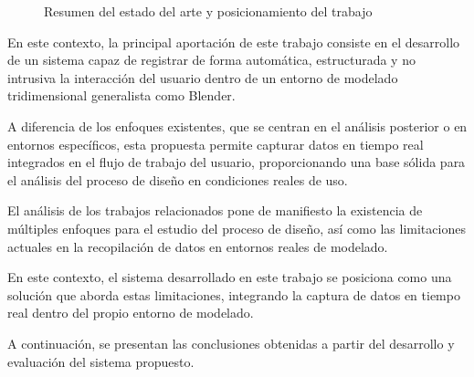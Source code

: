 \begin{figure}[H]
\centering
{}
\caption{Resumen del estado del arte y posicionamiento del trabajo}
\end{figure}

En este contexto, la principal aportación de este trabajo consiste en el desarrollo de un sistema capaz de registrar de forma automática, estructurada y no intrusiva la interacción del usuario dentro de un entorno de modelado tridimensional generalista como Blender. 

A diferencia de los enfoques existentes, que se centran en el análisis posterior o en entornos específicos, esta propuesta permite capturar datos en tiempo real integrados en el flujo de trabajo del usuario, proporcionando una base sólida para el análisis del proceso de diseño en condiciones reales de uso.

El análisis de los trabajos relacionados pone de manifiesto la existencia de múltiples enfoques para el estudio del proceso de diseño, así como las limitaciones actuales en la recopilación de datos en entornos reales de modelado. 

En este contexto, el sistema desarrollado en este trabajo se posiciona como una solución que aborda estas limitaciones, integrando la captura de datos en tiempo real dentro del propio entorno de modelado. 

A continuación, se presentan las conclusiones obtenidas a partir del desarrollo y evaluación del sistema propuesto.

